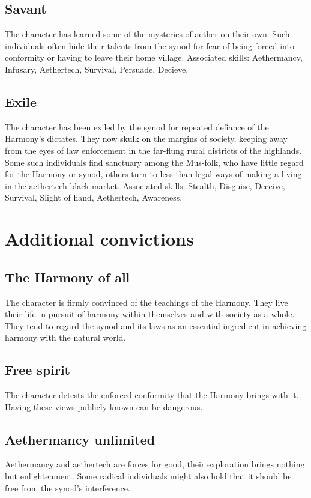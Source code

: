 \documentclass[a4paper,11pt,oneside]{book}
\begin{document}
\subsection{Savant}
The character has learned some of the mysteries of aether on their own. Such individuals often hide their talents from the synod for fear of being forced into conformity or having to leave their home village. Associated skills: Aethermancy, Infusary, Aethertech, Survival, Persuade, Decieve. 

\subsection{Exile}
The character has been exiled by the synod for repeated defiance of the Harmony's dictates. They now skulk on the margins of society, keeping away from the eyes of law enforcement in the far-flung rural districts of the highlands. Some such individuals find sanctuary among the Mus-folk, who have little regard for the Harmony or synod, others turn to less than legal ways of making a living in the aethertech black-market. Associated skills: Stealth, Disguise, Deceive, Survival, Slight of hand, Aethertech, Awareness.   


\section{Additional convictions}

\subsection{The Harmony of all}
The character is firmly convinced of the teachings of the Harmony. They live their life in pursuit of harmony within themselves and with society as a whole. They tend to regard the synod and its laws as an essential ingredient in achieving harmony with the natural world.

\subsection{Free spirit}
The character detests the enforced conformity that the Harmony brings with it. Having these views publicly known can be dangerous. 

\subsection{Aethermancy unlimited}
Aethermancy and aethertech are forces for good, their exploration brings nothing but enlightenment. Some radical individuals might also hold that it should be free from the synod's interference. 
\end{document}
